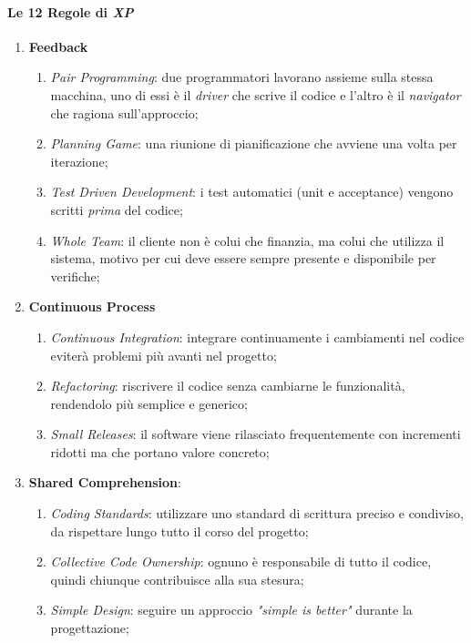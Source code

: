 \documentclass[../main.tex]{subfiles}
\begin{document}
        		\paragraph{Le 12 Regole di \emph{XP}}
        		\begin{enumerate}
        			\item \textbf{Feedback}
        				\begin{enumerate}
        					\item \emph{Pair Programming}: due programmatori lavorano assieme sulla stessa macchina, uno di essi è il \emph{driver} che scrive il codice e l'altro è il \emph{navigator} che ragiona sull'approccio;
        					\item \emph{Planning Game}: una riunione di pianificazione che avviene una volta per iterazione;
        					\item \emph{Test Driven Development}: i test automatici (unit e acceptance) vengono scritti \emph{prima} del codice;
        					\item \emph{Whole Team}: il cliente non è colui che finanzia, ma colui che utilizza il sistema, motivo per cui deve essere sempre presente e disponibile per verifiche;
        				\end{enumerate}
        			\item \textbf{Continuous Process}
        				\begin{enumerate}
        					\item \emph{Continuous Integration}: integrare continuamente i cambiamenti nel codice eviterà problemi più avanti nel progetto;
        					\item \emph{Refactoring}: riscrivere il codice senza cambiarne le funzionalità, rendendolo più semplice e generico;
        					\item \emph{Small Releases}: il software viene rilasciato frequentemente con incrementi ridotti ma che portano valore concreto;
        				\end{enumerate}
        			\item \textbf{Shared Comprehension}:
        				\begin{enumerate}
        					\item \emph{Coding Standards}: utilizzare uno standard di scrittura preciso e condiviso, da rispettare lungo tutto il corso del progetto;
        					\item \emph{Collective Code Ownership}: ognuno è responsabile di tutto il codice, quindi chiunque contribuisce alla sua stesura;
        					\item \emph{Simple Design}: seguire un approccio \emph{"simple is better"} durante la progettazione;

\end{enumerate}
\end{enumerate}
\end{document}
